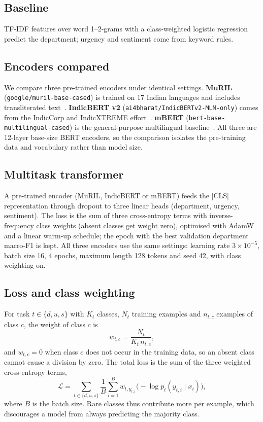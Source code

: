 \documentclass[conference]{IEEEtran}
\begin{document}
\subsection{Baseline}
TF-IDF features over word 1--2-grams with a class-weighted logistic regression predict the department; urgency and sentiment come from keyword rules.
\subsection{Encoders compared}
We compare three pre-trained encoders under identical settings.
\textbf{MuRIL} (\texttt{google/muril-base-cased}) is trained on 17 Indian languages and includes transliterated text~\cite{khanuja2021muril}.
\textbf{IndicBERT v2} (\texttt{ai4bharat/IndicBERTv2-MLM-only}) comes from the IndicCorp and IndicXTREME effort~\cite{kakwani2020indicnlp,doddapaneni2023towards}.
\textbf{mBERT} (\texttt{bert-base-multilingual-cased}) is the general-purpose multilingual baseline~\cite{devlin2019bert}.
All three are 12-layer base-size BERT encoders, so the comparison isolates the pre-training data and vocabulary rather than model size.
\subsection{Multitask transformer}
A pre-trained encoder (MuRIL, IndicBERT or mBERT) feeds the [CLS] representation through dropout to three linear heads (department, urgency, sentiment).
The loss is the sum of three cross-entropy terms with inverse-frequency class weights (absent classes get weight zero), optimised with AdamW and a linear warm-up schedule;
the epoch with the best validation department macro-F1 is kept. All three encoders use the same settings: learning rate $3{\times}10^{-5}$, batch size 16, 4 epochs, maximum length 128 tokens and seed 42, with class weighting on.
\subsection{Loss and class weighting}
For task $t \in \{d,u,s\}$ with $K_t$ classes, $N_t$ training examples and $n_{t,c}$ examples of class $c$, the weight of class $c$ is
\begin{equation}
w_{t,c} = \frac{N_t}{K_t \, n_{t,c}},
\end{equation}
and $w_{t,c}=0$ when class $c$ does not occur in the training data, so an absent class cannot cause a division by zero. The total loss is the sum of the three weighted cross-entropy terms,
\begin{equation}
\mathcal{L} = \sum_{t \in \{d,u,s\}} \frac{1}{B}\sum_{i=1}^{B} w_{t,y_{t,i}} \bigl(-\log p_t(y_{t,i}\mid x_i)\bigr),
\end{equation}
where $B$ is the batch size. Rare classes thus contribute more per example, which discourages a model from always predicting the majority class.
\end{document}
